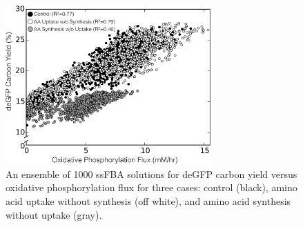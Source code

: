 \documentclass[journal=asbcd6,manuscript=article]{achemso}
\begin{document}
\begin{figure}[t!]
\includegraphics[width=0.7\textwidth]{./Figures/OxPhos_yield.pdf}
\caption{An ensemble of 1000 ssFBA solutions for deGFP carbon yield versus oxidative phosphorylation flux for three cases: control (black), amino acid uptake without synthesis (off white), and amino acid synthesis without uptake (gray). }
\label{fig:oxphos}
\end{figure}
\end{document}

